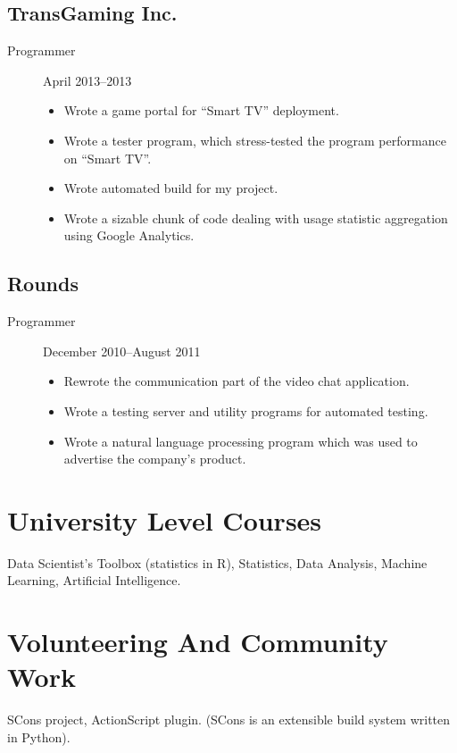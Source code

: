 \documentclass[11pt]{article}
\begin{document}
\subsection*{TransGaming Inc.}
\label{sec-2-4}
\begin{description}
\item[{Programmer}] April 2013--2013
\begin{itemize}
\item Wrote a game portal for ``Smart TV'' deployment.
\item Wrote a tester program, which stress-tested the program
performance on ``Smart TV''.
\item Wrote automated build for my project.
\item Wrote a sizable chunk of code dealing with usage statistic
aggregation using Google Analytics.
\end{itemize}
\end{description}

\subsection*{Rounds}
\label{sec-2-5}
\begin{description}
\item[{Programmer}] December 2010--August 2011
\begin{itemize}
\item Rewrote the communication part of the video chat application.
\item Wrote a testing server and utility programs for automated
testing.
\item Wrote a natural language processing program which was used
to advertise the company's product.
\end{itemize}
\end{description}

\section*{University Level Courses}
\label{sec-3}
Data Scientist's Toolbox (statistics in R), Statistics, Data
Analysis, Machine Learning, Artificial Intelligence.

\section*{Volunteering And Community Work}
\label{sec-4}
SCons project, ActionScript plugin.  (SCons is an extensible build system
written in Python).
\end{document}

